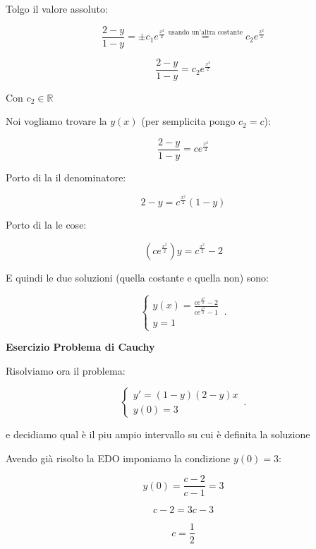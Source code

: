 \documentclass[11pt]{article}
\begin{document}
\begin{enumerate}
        Tolgo il valore assoluto:

        \[
            \frac{2-y}{1-y} = \pm c_1 e ^{\frac{x ^{2}}{2} }\overset{\text{usando un'altra costante}}{=}c_2 e ^{\frac{x ^{2}}{2} }
        \]

        \[
            \frac{2-y}{1-y} = c_2 e ^{\frac{x ^{2}}{2} }
        \]

        Con $c_2 \in \mathbb{R}$

        Noi vogliamo trovare la $y(x)$ (per semplicita pongo $c_2 = c$):

        \[
            \frac{2-y}{1-y} = c e ^{\frac{x ^{2}}{2} }
        \]

        Porto di la il denominatore:

        \[
            2-y = c ^{\frac{x ^{2}}{2} } (1-y)
        \]

        Porto di la le cose:

        \[
            (c e ^{\frac{x ^{2}}{2} })y = c ^{\frac{x ^{2}}{2} }-2
        \]

        E quindi le due soluzioni (quella costante e quella non) sono:

        \begin{equation}
            \begin{cases}
            y(x) = \frac{c e ^{\frac{x ^{2}}{2} }-2}{c e ^{\frac{x ^{2}}{2} }-1}   \\
            y=1
            \end{cases}\,.
        \end{equation}

\end{enumerate}

\textbf{Esercizio Problema di Cauchy}

Risolviamo ora il problema:

\begin{equation}
    \begin{cases}
      y'=(1-y)(2-y)x\\
      y(0)=3
    \end{cases}\,.
\end{equation}

e decidiamo qual è il piu ampio intervallo su cui è definita la soluzione

Avendo già risolto la EDO imponiamo la condizione $y(0) = 3$:

\[
    y(0) = \frac{c-2}{c-1} = 3
\]

\[
    c-2 = 3c -3
\]

\[
    c = \frac{1}{2} 
\]
\end{document}
